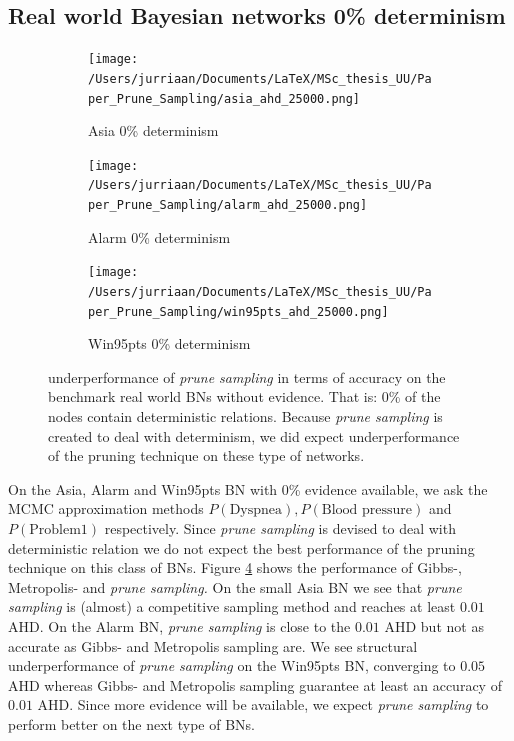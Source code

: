 \documentclass[a4paper, twoside, 11pt]{report}
\theoremstyle{plain}
\theoremstyle{definition}
\theoremstyle{remark}
\newcommand{\ps}{\textit{prune sampling }}
\newcommand{\psp}{\textit{prune sampling. }}
\begin{document}
\subsection{Real world Bayesian networks 0\% determinism}\label{real_world_0_ev}
\begin{figure}[h!]
\centering
\begin{subfigure}{0.5\textwidth}
\texttt{[image: /Users/jurriaan/Documents/LaTeX/MSc\_thesis\_UU/Paper\_Prune\_Sampling/asia\_ahd\_25000.png]}
\caption{Asia 0\% determinism}%
\label{asia}%
\end{subfigure}\hfill%
\begin{subfigure}{0.5\textwidth}
\texttt{[image: /Users/jurriaan/Documents/LaTeX/MSc\_thesis\_UU/Paper\_Prune\_Sampling/alarm\_ahd\_25000.png]}
\caption{Alarm 0\% determinism}%
\label{alarm}%
\end{subfigure}%
\begin{subfigure}{0.5\textwidth}
\texttt{[image: /Users/jurriaan/Documents/LaTeX/MSc\_thesis\_UU/Paper\_Prune\_Sampling/win95pts\_ahd\_25000.png]}
\caption{Win95pts 0\% determinism}%
\label{win95pts}%
\end{subfigure}\hfill%
\vspace{0.75pc}
\caption{underperformance of \ps in terms of accuracy on the benchmark real world BNs without evidence. That is: 0\% of the nodes contain deterministic relations. Because \ps is created to deal with determinism, we did expect underperformance of the pruning technique on these type of networks.  }
\label{results1}
\end{figure}
On the Asia, Alarm and Win95pts BN with 0\% evidence available, we ask the MCMC approximation methods $P(\text{Dyspnea}), P(\text{Blood pressure})$ and $P(\text{Problem1})$ respectively. Since \ps is devised to deal with deterministic relation we do not expect the best performance of the pruning technique on this class of BNs. Figure \ref{results1} shows the performance of Gibbs-, Metropolis- and \psp On the small Asia BN we see that \ps is (almost) a competitive sampling method and reaches at least $0.01$ AHD. On the Alarm BN, \ps is close to the $0.01$ AHD but not as accurate as Gibbs- and Metropolis sampling are. We see structural underperformance of \ps on the Win95pts BN, converging to $0.05$ AHD whereas Gibbs- and Metropolis sampling guarantee at least an accuracy of $0.01$ AHD. Since more evidence will be available, we expect \ps to perform better on the next type of BNs.
\end{document}
